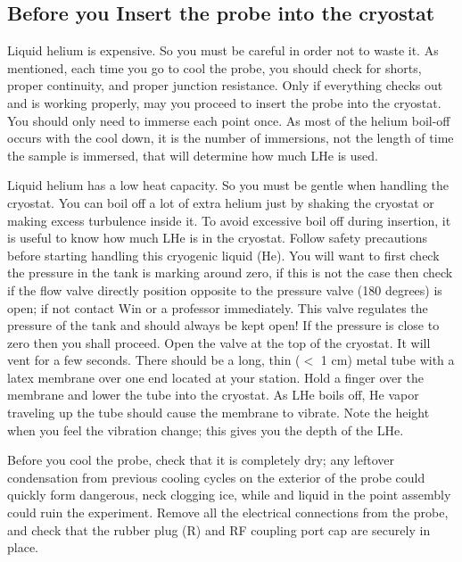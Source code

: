 \documentclass{../lab}
\begin{document}

\subsection{Before you Insert the probe into the cryostat}

Liquid helium is expensive. So you must be careful in order not to waste it. As mentioned, each time you go to cool the probe, you should check for shorts, proper continuity, and proper junction resistance. Only if everything checks out and is working properly, may you proceed to insert the probe into the cryostat. You should only need to immerse each point once. As most of the helium boil-off occurs with the cool down, it is the number of immersions, not the length of time the sample is immersed, that will determine how much LHe is used.

Liquid helium has a low heat capacity. So you must be gentle when handling the cryostat. You can boil off a lot of extra helium just by shaking the cryostat or making excess turbulence inside it. To avoid excessive boil off during insertion, it is useful to know how much LHe is in the cryostat. Follow safety precautions before starting handling this cryogenic liquid (He). You will want to first check the pressure in the tank is marking around zero, if this is not the case then check if the flow valve directly position opposite to the pressure valve (180 degrees) is open; if not contact Win or a professor immediately. This valve regulates the pressure of the tank and should always be kept open! If the pressure is close to zero then you shall proceed. Open the valve at the top of the cryostat. It will vent for a few seconds. There should be a long, thin ($<$ 1 cm) metal tube with a latex membrane over one end located at your station. Hold a finger over the membrane and lower the tube into the cryostat. As LHe boils off, He vapor traveling up the tube should cause the membrane to vibrate. Note the height when you feel the vibration change; this gives you the depth of the LHe.

Before you cool the probe, check that it is completely dry; any leftover condensation from previous cooling cycles on the exterior of the probe could quickly form dangerous, neck clogging ice, while and liquid in the point assembly could ruin the experiment. Remove all the electrical connections from the probe, and check that the rubber plug (R) and RF coupling port cap are securely in place.
\end{document}
